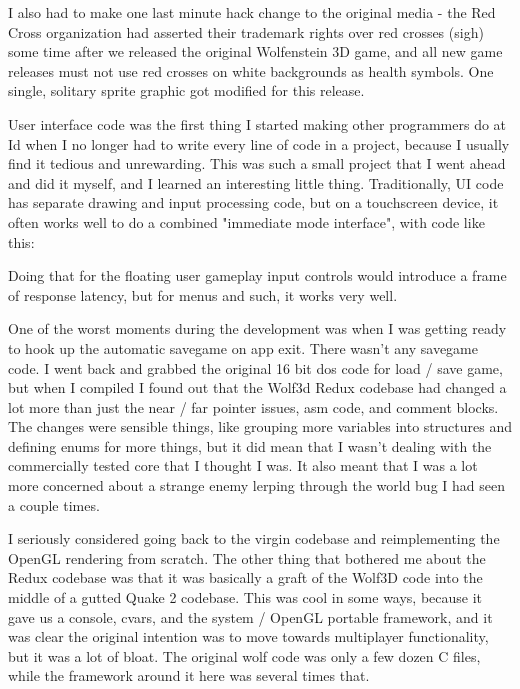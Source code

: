 \documentclass[book.tex]{subfiles}
\begin{document}
I also had to make one last minute hack change to the original media - the Red Cross organization had asserted their trademark rights over red crosses (sigh) some time after we released the original Wolfenstein 3D game, and all new game releases must not use red crosses on white backgrounds as health symbols.  One single, solitary sprite graphic got modified for this release.\\
\par

User interface code was the first thing I started making other programmers do at Id when I no longer had to write every line of code in a project, because I usually find it tedious and unrewarding.  This was such a small project that I went ahead and did it myself, and I learned an interesting little thing.  Traditionally, UI code has separate drawing and input processing code, but on a touchscreen device, it often works well to do a combined "immediate mode interface", with code like this:\\
\par
\begin{minipage}{\textwidth}

\end{minipage}
\par
Doing that for the floating user gameplay input controls would introduce a frame of response latency, but for menus and such, it works very well.\\
\par

One of the worst moments during the development was when I was getting ready to hook up the automatic savegame on app exit.  There wasn't any savegame code.  I went back and grabbed the original 16 bit dos code for load / save game, but when I compiled I found out that the Wolf3d Redux codebase had changed a lot more than just the near / far pointer issues, asm code, and comment blocks.  The changes were sensible things, like grouping more variables into structures and defining enums for more things, but it did mean that I wasn't dealing with the commercially tested core that I thought I was.  It also meant that I was a lot more concerned about a strange enemy lerping through the world bug I had seen a couple times.\\
\par

I seriously considered going back to the virgin codebase and reimplementing the OpenGL rendering from scratch.  The other thing that bothered me about the Redux codebase was that it was basically a graft of the Wolf3D code into the middle of a gutted Quake 2 codebase.  This was cool in some ways, because it gave us a console, cvars, and the system / OpenGL portable framework, and it was clear the original intention was to move towards multiplayer functionality, but it was a lot of bloat.  The original wolf code was only a few dozen C files, while the framework around it here was several times that.\\
\par
\end{document}
